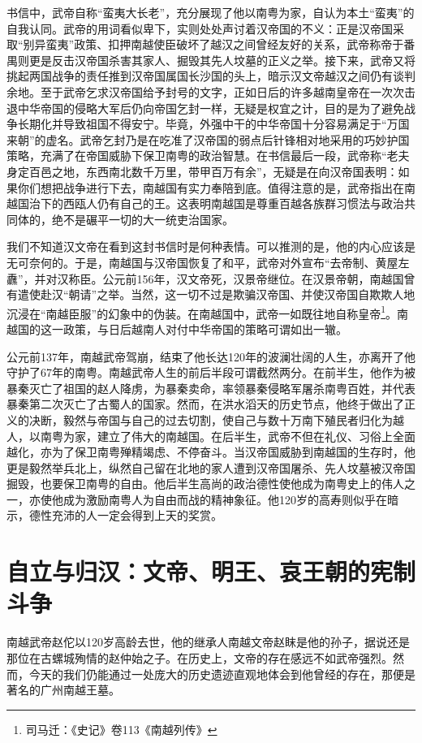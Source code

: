 书信中，武帝自称“蛮夷大长老”，充分展现了他以南粤为家，自认为本土“蛮夷”的自我认同。武帝的用词看似卑下，实则处处声讨着汉帝国的不义：正是汉帝国采取“别异蛮夷”政策、扣押南越使臣破坏了越汉之间曾经友好的关系，武帝称帝于番禺则更是反击汉帝国杀害其家人、掘毁其先人坟墓的正义之举。接下来，武帝又将挑起两国战争的责任推到汉帝国属国长沙国的头上，暗示汉文帝越汉之间仍有谈判余地。至于武帝乞求汉帝国给予封号的文字，正如日后的许多越南皇帝在一次次击退中华帝国的侵略大军后仍向帝国乞封一样，无疑是权宜之计，目的是为了避免战争长期化并导致祖国不得安宁。毕竟，外强中干的中华帝国十分容易满足于“万国来朝”的虚名。武帝乞封乃是在吃准了汉帝国的弱点后针锋相对地采用的巧妙护国策略，充满了在帝国威胁下保卫南粤的政治智慧。在书信最后一段，武帝称“老夫身定百邑之地，东西南北数千万里，带甲百万有余”，无疑是在向汉帝国表明：如果你们想把战争进行下去，南越国有实力奉陪到底。值得注意的是，武帝指出在南越国治下的西瓯人仍有自己的王。这表明南越国是尊重百越各族群习惯法与政治共同体的，绝不是碾平一切的大一统吏治国家。

我们不知道汉文帝在看到这封书信时是何种表情。可以推测的是，他的内心应该是无可奈何的。于是，南越国与汉帝国恢复了和平，武帝对外宣布“去帝制、黄屋左纛”，并对汉称臣。公元前156年，汉文帝死，汉景帝继位。在汉景帝朝，南越国曾有遣使赴汉“朝请”之举。当然，这一切不过是欺骗汉帝国、并使汉帝国自欺欺人地沉浸在“南越臣服”的幻象中的伪装。在南越国中，武帝一如既往地自称皇帝\footnote{司马迁：《史记》卷113《南越列传》}。南越国的这一政策，与日后越南人对付中华帝国的策略可谓如出一辙。

公元前137年，南越武帝驾崩，结束了他长达120年的波澜壮阔的人生，亦离开了他守护了67年的南粤。南越武帝人生的前后半段可谓截然两分。在前半生，他作为被暴秦灭亡了祖国的赵人降虏，为暴秦卖命，率领暴秦侵略军屠杀南粤百姓，并代表暴秦第二次灭亡了古蜀人的国家。然而，在洪水滔天的历史节点，他终于做出了正义的决断，毅然与帝国与自己的过去切割，使自己与数十万南下殖民者归化为越人，以南粤为家，建立了伟大的南越国。在后半生，武帝不但在礼仪、习俗上全面越化，亦为了保卫南粤殚精竭虑、不停奋斗。当汉帝国威胁到南越国的生存时，他更是毅然举兵北上，纵然自己留在北地的家人遭到汉帝国屠杀、先人坟墓被汉帝国掘毁，也要保卫南粤的自由。他后半生高尚的政治德性使他成为南粤史上的伟人之一，亦使他成为激励南粤人为自由而战的精神象征。他120岁的高寿则似乎在暗示，德性充沛的人一定会得到上天的奖赏。

\section{自立与归汉：文帝、明王、哀王朝的宪制斗争}

\indent 南越武帝赵佗以120岁高龄去世，他的继承人南越文帝赵眜是他的孙子，据说还是那位在古螺城殉情的赵仲始之子。在历史上，文帝的存在感远不如武帝强烈。然而，今天的我们仍能通过一处庞大的历史遗迹直观地体会到他曾经的存在，那便是著名的广州南越王墓。

